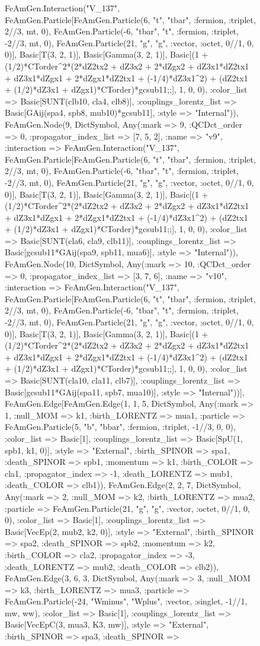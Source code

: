 \documentclass{revtex4}
\begin{document}
\begin{figure}[!htb]
\begin{center}
{FeAmGen.Interaction("V_137", FeAmGen.Particle[FeAmGen.Particle(6, "t", "tbar", :fermion, :triplet, 2//3, mt, 0), FeAmGen.Particle(-6, "tbar", "t", :fermion, :triplet, -2//3, mt, 0), FeAmGen.Particle(21, "g", "g", :vector, :octet, 0//1, 0, 0)], Basic[T(3, 2, 1)], Basic[Gamma(3, 2, 1)], Basic[(1 + (1/2)*CTorder^2*(2*dZ2tx2 + dZ3x2 + 2*dZgx2 + dZ3x1*dZ2tx1 + dZ3x1*dZgx1 + 2*dZgx1*dZ2tx1 + (-1/4)*dZ3x1^2) + (dZ2tx1 + (1/2)*dZ3x1 + dZgx1)*CTorder)*gcsub11;;], 1, 0, 0), :color_list => Basic[SUNT(clb10, cla4, clb8)], :couplings_lorentz_list => Basic[GAij(spa4, spb8, mub10)*gcsub11], :style => "Internal")), FeAmGen.Node(9, Dict{Symbol, Any}(:mark => 9, :QCDct_order => 0, :propagator_index_list => [7, 5, 2], :name => "v9", :interaction => FeAmGen.Interaction("V_137", FeAmGen.Particle[FeAmGen.Particle(6, "t", "tbar", :fermion, :triplet, 2//3, mt, 0), FeAmGen.Particle(-6, "tbar", "t", :fermion, :triplet, -2//3, mt, 0), FeAmGen.Particle(21, "g", "g", :vector, :octet, 0//1, 0, 0)], Basic[T(3, 2, 1)], Basic[Gamma(3, 2, 1)], Basic[(1 + (1/2)*CTorder^2*(2*dZ2tx2 + dZ3x2 + 2*dZgx2 + dZ3x1*dZ2tx1 + dZ3x1*dZgx1 + 2*dZgx1*dZ2tx1 + (-1/4)*dZ3x1^2) + (dZ2tx1 + (1/2)*dZ3x1 + dZgx1)*CTorder)*gcsub11;;], 1, 0, 0), :color_list => Basic[SUNT(cla6, cla9, clb11)], :couplings_lorentz_list => Basic[gcsub11*GAij(spa9, spb11, mua6)], :style => "Internal")), FeAmGen.Node(10, Dict{Symbol, Any}(:mark => 10, :QCDct_order => 0, :propagator_index_list => [3, 7, 6], :name => "v10", :interaction => FeAmGen.Interaction("V_137", FeAmGen.Particle[FeAmGen.Particle(6, "t", "tbar", :fermion, :triplet, 2//3, mt, 0), FeAmGen.Particle(-6, "tbar", "t", :fermion, :triplet, -2//3, mt, 0), FeAmGen.Particle(21, "g", "g", :vector, :octet, 0//1, 0, 0)], Basic[T(3, 2, 1)], Basic[Gamma(3, 2, 1)], Basic[(1 + (1/2)*CTorder^2*(2*dZ2tx2 + dZ3x2 + 2*dZgx2 + dZ3x1*dZ2tx1 + dZ3x1*dZgx1 + 2*dZgx1*dZ2tx1 + (-1/4)*dZ3x1^2) + (dZ2tx1 + (1/2)*dZ3x1 + dZgx1)*CTorder)*gcsub11;;], 1, 0, 0), :color_list => Basic[SUNT(cla10, cla11, clb7)], :couplings_lorentz_list => Basic[gcsub11*GAij(spa11, spb7, mua10)], :style => "Internal"))], FeAmGen.Edge[FeAmGen.Edge(1, 1, 5, Dict{Symbol, Any}(:mark => 1, :null_MOM => k1, :birth_LORENTZ => mua1, :particle => FeAmGen.Particle(5, "b", "bbar", :fermion, :triplet, -1//3, 0, 0), :color_list => Basic[1], :couplings_lorentz_list => Basic[SpU(1, spb1, k1, 0)], :style => "External", :birth_SPINOR => spa1, :death_SPINOR => spb1, :momentum => k1, :birth_COLOR => cla1, :propagator_index => -1, :death_LORENTZ => mub1, :death_COLOR => clb1)), FeAmGen.Edge(2, 2, 7, Dict{Symbol, Any}(:mark => 2, :null_MOM => k2, :birth_LORENTZ => mua2, :particle => FeAmGen.Particle(21, "g", "g", :vector, :octet, 0//1, 0, 0), :color_list => Basic[1], :couplings_lorentz_list => Basic[VecEp(2, mub2, k2, 0)], :style => "External", :birth_SPINOR => spa2, :death_SPINOR => spb2, :momentum => k2, :birth_COLOR => cla2, :propagator_index => -3, :death_LORENTZ => mub2, :death_COLOR => clb2)), FeAmGen.Edge(3, 6, 3, Dict{Symbol, Any}(:mark => 3, :null_MOM => k3, :birth_LORENTZ => mua3, :particle => FeAmGen.Particle(-24, "Wminus", "Wplus", :vector, :singlet, -1//1, mw, ww), :color_list => Basic[1], :couplings_lorentz_list => Basic[VecEpC(3, mua3, K3, mw)], :style => "External", :birth_SPINOR => spa3, :death_SPINOR => }
\end{center}
\end{figure}
\end{document}
